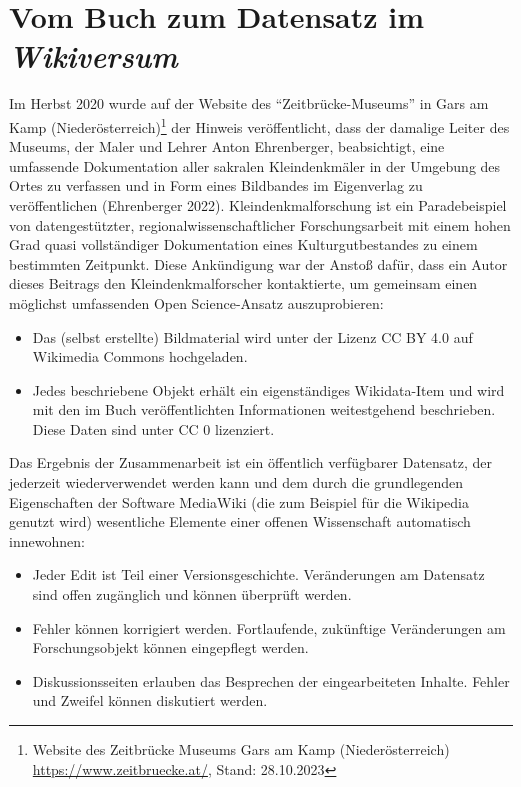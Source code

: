 \documentclass[a4paper,
fontsize=11pt,
oneside,
numbers=noperiodatend,
parskip=half-,
bibliography=totoc,
final
]{scrartcl}
\begin{document}
\hypertarget{vom-buch-zum-datensatz-im-wikiversum}{%
\section{\texorpdfstring{Vom Buch zum Datensatz im
\emph{Wikiversum}}{Vom Buch zum Datensatz im Wikiversum}}\label{vom-buch-zum-datensatz-im-wikiversum}}

Im Herbst 2020 wurde auf der Website des \enquote{Zeitbrücke-Museums} in
Gars am Kamp (Niederösterreich)\footnote{Website des Zeitbrücke Museums
  Gars am Kamp (Niederösterreich) \url{https://www.zeitbruecke.at/},
  Stand: 28.10.2023} der Hinweis veröffentlicht, dass der damalige
Leiter des Museums, der Maler und Lehrer Anton Ehrenberger,
beabsichtigt, eine umfassende Dokumentation aller sakralen
Kleindenkmäler in der Umgebung des Ortes zu verfassen und in Form eines
Bildbandes im Eigenverlag zu veröffentlichen (Ehrenberger 2022).
Kleindenkmalforschung ist ein Paradebeispiel von datengestützter,
regionalwissenschaftlicher Forschungsarbeit mit einem hohen Grad quasi
vollständiger Dokumentation eines Kulturgutbestandes zu einem bestimmten
Zeitpunkt. Diese Ankündigung war der Anstoß dafür, dass ein Autor dieses
Beitrags den Kleindenkmalforscher kontaktierte, um gemeinsam einen
möglichst umfassenden Open Science-Ansatz auszuprobieren:

\begin{itemize}
\item
  Das (selbst erstellte) Bildmaterial wird unter der Lizenz CC BY 4.0
  auf Wikimedia Commons hochgeladen.
\item
  Jedes beschriebene Objekt erhält ein eigenständiges Wikidata-Item und
  wird mit den im Buch veröffentlichten Informationen weitestgehend
  beschrieben. Diese Daten sind unter CC 0 lizenziert.
\end{itemize}

Das Ergebnis der Zusammenarbeit ist ein öffentlich verfügbarer
Datensatz, der jederzeit wiederverwendet werden kann und dem durch die
grundlegenden Eigenschaften der Software MediaWiki (die zum Beispiel für
die Wikipedia genutzt wird) wesentliche Elemente einer offenen
Wissenschaft automatisch innewohnen:

\begin{itemize}
\item
  Jeder Edit ist Teil einer Versionsgeschichte. Veränderungen am
  Datensatz sind offen zugänglich und können überprüft werden.
\item
  Fehler können korrigiert werden. Fortlaufende, zukünftige
  Veränderungen am Forschungsobjekt können eingepflegt werden.
\item
  Diskussionsseiten erlauben das Besprechen der eingearbeiteten Inhalte.
  Fehler und Zweifel können diskutiert werden.
\end{itemize}
\end{document}
